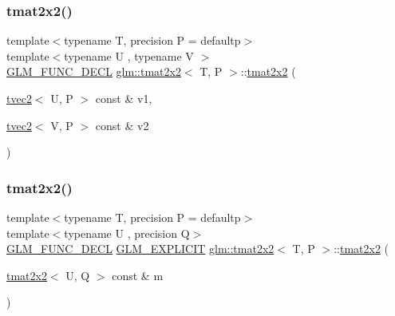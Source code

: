 \mbox{\label{structglm_1_1tmat2x2_ab910eb77d8f50dfa02ad062bb429e0a5}} 
\subsubsection{\texorpdfstring{tmat2x2()}{tmat2x2()}\hspace{0.1cm}{\footnotesize\ttfamily [9/22]}}
{\footnotesize\ttfamily template$<$typename T, precision P = defaultp$>$ \\
template$<$typename U , typename V $>$ \\
\mbox{\hyperlink{setup_8hpp_ab2d052de21a70539923e9bcbf6e83a51}{G\+L\+M\+\_\+\+F\+U\+N\+C\+\_\+\+D\+E\+CL}} \mbox{\hyperlink{structglm_1_1tmat2x2}{glm\+::tmat2x2}}$<$ T, P $>$\+::\mbox{\hyperlink{structglm_1_1tmat2x2}{tmat2x2}} (\begin{DoxyParamCaption}\item[{\mbox{\hyperlink{structglm_1_1tvec2}{tvec2}}$<$ U, P $>$ const \&}]{v1,  }\item[{\mbox{\hyperlink{structglm_1_1tvec2}{tvec2}}$<$ V, P $>$ const \&}]{v2 }\end{DoxyParamCaption})}

\mbox{\label{structglm_1_1tmat2x2_add527359c118148fb8984d4868e0dc7f}} 
\subsubsection{\texorpdfstring{tmat2x2()}{tmat2x2()}\hspace{0.1cm}{\footnotesize\ttfamily [10/22]}}
{\footnotesize\ttfamily template$<$typename T, precision P = defaultp$>$ \\
template$<$typename U , precision Q$>$ \\
\mbox{\hyperlink{setup_8hpp_ab2d052de21a70539923e9bcbf6e83a51}{G\+L\+M\+\_\+\+F\+U\+N\+C\+\_\+\+D\+E\+CL}} \mbox{\hyperlink{setup_8hpp_a6c74f5a5e7b134ab69023ff9a30d4d5d}{G\+L\+M\+\_\+\+E\+X\+P\+L\+I\+C\+IT}} \mbox{\hyperlink{structglm_1_1tmat2x2}{glm\+::tmat2x2}}$<$ T, P $>$\+::\mbox{\hyperlink{structglm_1_1tmat2x2}{tmat2x2}} (\begin{DoxyParamCaption}\item[{\mbox{\hyperlink{structglm_1_1tmat2x2}{tmat2x2}}$<$ U, Q $>$ const \&}]{m }\end{DoxyParamCaption})}

